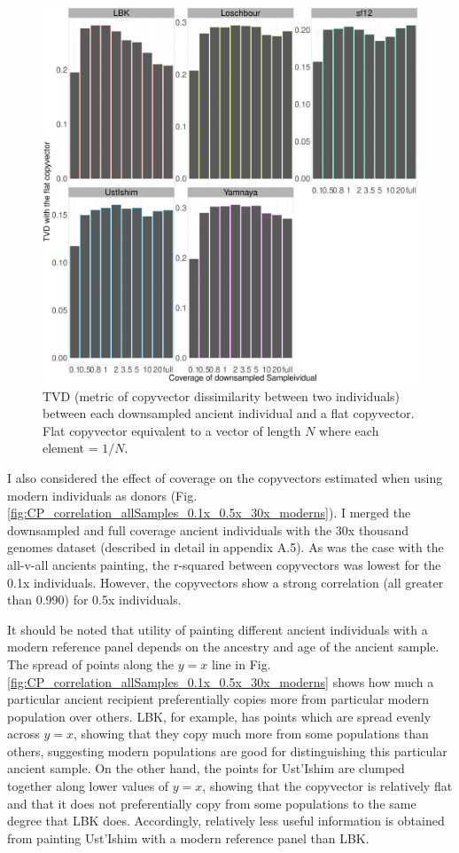 \begin{figure}[htp]
    \centering
    \includegraphics[width=1.0\textwidth]{../images/chapter1/TVD_ancients_flat_prior.pdf}
    \caption{TVD (metric of copyvector dissimilarity between two individuals) between each downsampled ancient individual and a flat copyvector. Flat copyvector equivalent to a vector of length $N$ where each element = $1/N$.}
    \label{fig:TVD_ancients_flat_prior}
\end{figure}

I also considered the effect of coverage on the copyvectors estimated when using modern individuals as donors (Fig. \ref{fig:CP_correlation_allSamples_0.1x_0.5x_30x_moderns}). I merged the downsampled and full coverage ancient individuals with the 30x thousand genomes dataset (described in detail in appendix A.5). As was the case with the all-v-all ancients painting, the r-squared between copyvectors was lowest for the 0.1x individuals. However, the copyvectors show a strong correlation (all greater than 0.990) for 0.5x individuals. 

It should be noted that utility of painting different ancient individuals with a modern reference panel depends on the ancestry and age of the ancient sample. The spread of points along the $y=x$ line in Fig. \ref{fig:CP_correlation_allSamples_0.1x_0.5x_30x_moderns} shows how much a particular ancient recipient preferentially copies more from particular modern population over others. LBK, for example, has points which are spread evenly across $y=x$, showing that they copy much more from some populations than others, suggesting modern populations are good for distinguishing this particular ancient sample. On the other hand, the points for Ust'Ishim are clumped together along lower values of $y=x$, showing that the copyvector is relatively flat and that it does not preferentially copy from some populations to the same degree that LBK does. Accordingly, relatively less useful information is obtained from painting Ust'Ishim with a modern reference panel than LBK.

